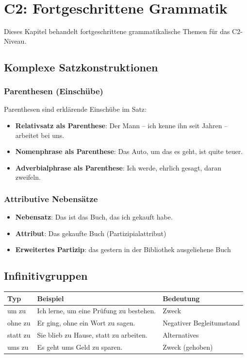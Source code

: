\chapter{C2: Fortgeschrittene Grammatik}
\label{cha:C2Fortgeschritten}

Dieses Kapitel behandelt fortgeschrittene grammatikalische Themen für das C2-Niveau.

\section{Komplexe Satzkonstruktionen}
\label{sec:C2KomplexeSaetze}

\subsection{Parenthesen (Einschübe)}
Parenthesen sind erklärende Einschübe im Satz:

\begin{itemize}
    \item \textbf{Relativsatz als Parenthese}: Der Mann – ich kenne ihn seit Jahren – arbeitet bei uns.
    \item \textbf{Nomenphrase als Parenthese}: Das Auto, um das es geht, ist quite teuer.
    \item \textbf{Adverbialphrase als Parenthese}: Ich werde, ehrlich gesagt, daran zweifeln.
\end{itemize}

\subsection{Attributive Nebensätze}
\begin{itemize}
    \item \textbf{Nebensatz}: Das ist das Buch, das ich gekauft habe.
    \item \textbf{Attribut}: Das gekaufte Buch (Partizipialattribut)
    \item \textbf{Erweitertes Partizip}: das gestern in der Bibliothek ausgeliehene Buch
\end{itemize}

\section{Infinitivgruppen}
\label{sec:C2Infinitiv}

\begin{center}
\begin{tabular}{|l|l|p{6cm}|}
\hline
Typ & Beispiel & Bedeutung \\ \hline
um zu & Ich lerne, um eine Prüfung zu bestehen. & Zweck \\ \hline
ohne zu & Er ging, ohne ein Wort zu sagen. & Negativer Begleitumstand \\ \hline
statt zu & Sie blieb zu Hause, statt zu arbeiten. & Alternatives \\ \hline
ums zu & Es geht ums Geld zu sparen. & Zweck (gehoben) \\ \hline
\end{tabular}
\end{center}

